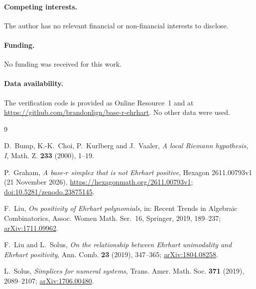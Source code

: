 \documentclass[11pt]{amsart}
\theoremstyle{remark}
\begin{document}
\paragraph{Competing interests.} The author has no relevant financial or non-financial
interests to disclose.

\paragraph{Funding.} No funding was received for this work.

\paragraph{Data availability.} The verification code is provided as Online
Resource~1 and at \url{https://github.com/brandonlign/base-r-ehrhart}. No other data
were used.

\begin{thebibliography}{9}

D.~Bump, K.-K.~Choi, P.~Kurlberg and J.~Vaaler, \emph{A local Riemann
hypothesis, I}, Math. Z. \textbf{233} (2000), 1--19.

P.~Graham, \emph{A base-$r$ simplex that is not Ehrhart positive},
Hexagon 2611.00793v1 (21 November 2026),
\url{https://hexagonmath.org/2611.00793v1};
\href{https://doi.org/10.5281/zenodo.23875145}{doi:10.5281/zenodo.23875145}.

F.~Liu, \emph{On positivity of Ehrhart polynomials}, in: Recent Trends in
Algebraic Combinatorics, Assoc. Women Math. Ser.~16, Springer, 2019,
189--237; \href{https://arxiv.org/abs/1711.09962}{arXiv:1711.09962}.

F.~Liu and L.~Solus, \emph{On the relationship between Ehrhart unimodality
and Ehrhart positivity}, Ann. Comb. \textbf{23} (2019), 347--365;
\href{https://arxiv.org/abs/1804.08258}{arXiv:1804.08258}.

L.~Solus, \emph{Simplices for numeral systems}, Trans. Amer. Math. Soc.
\textbf{371} (2019), 2089--2107;
\href{https://arxiv.org/abs/1706.00480}{arXiv:1706.00480}.

\end{thebibliography}
\end{document}
